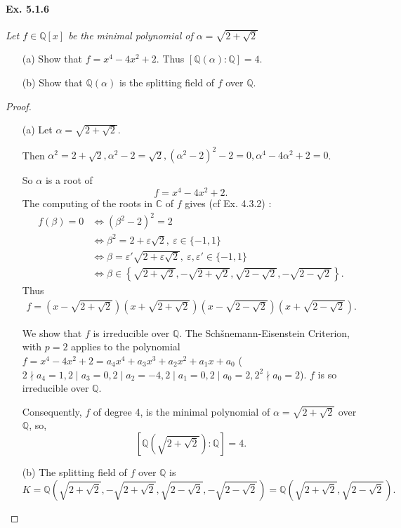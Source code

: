 \documentclass[11pt,a4paper]{article}
\newcommand{\Q}{\mathbb{Q}}
\newcommand{\C}{\mathbb{C}}
\begin{document}
\paragraph{Ex. 5.1.6}

{\it Let $f\in \Q[x]$ be the minimal polynomial of $\alpha = \sqrt{2+\sqrt{2}}$
\begin{enumerate}
\item[(a)] Show that $f = x^4-4x^2+2$. Thus $[\Q(\alpha) : \Q]=4$.
\item[(b)] Show that $\Q(\alpha)$ is the splitting field of $f$ over $\Q$.
\end{enumerate}
}

\begin{proof}
\begin{enumerate}
\item[(a)]
Let $\alpha= \sqrt{2+\sqrt{2}}$. 

Then $\alpha^2 = 2 + \sqrt{2}, \alpha^2-2 = \sqrt{2}, (\alpha^2-2)^2 - 2= 0, \alpha^4 - 4 \alpha^2 + 2 = 0$.

 So $\alpha$ is a root of
$$f= x^4-4x^2+2.$$
The computing of the roots in $\C$ of $f$ gives (cf Ex. 4.3.2) : 
\begin{align*}
f(\beta) = 0 &\iff (\beta^2-2)^2 = 2\\
&\iff \beta^2 = 2 +\varepsilon \sqrt{2}, \ \varepsilon \in \{-1,1\}\\
&\iff \beta =\varepsilon' \sqrt{2 +\varepsilon \sqrt{2}},\  \varepsilon, \varepsilon' \in \{-1,1\}\\
&\iff \beta \in \left\{   \sqrt{2+\sqrt{2}}, -\sqrt{2+\sqrt{2}}, \sqrt{2-\sqrt{2}},-\sqrt{2-\sqrt{2}}\right\}.
\end{align*}
Thus 
\begin{align}
f = \left(x-\sqrt{2+\sqrt{2}}\right)\left(x+\sqrt{2+\sqrt{2}}\right)\left(x-\sqrt{2-\sqrt{2}}\right)\left(x+\sqrt{2-\sqrt{2}}\right).
\end{align}

We show that $f$ is irreducible over $\Q$.
The Schšnemann-Eisenstein Criterion,  with $p=2$ applies to the polynomial $f= x^4-4x^2+2 = a_4x^4+a_3x^3+a_2x^2+a_1x+a_0$ 
($2 \nmid a_4 =1, 2 \mid a_3=0,2\mid a_2=-4, 2 \mid a_1=0,2 \mid a_0=2,  2^2 \nmid a_0 = 2$). $f$ is so irreducible over $\mathbb{Q}$.

Consequently, $f$ of degree 4, is the minimal polynomial of $\alpha=  \sqrt{2+\sqrt{2}}$ over $\Q$, so,
$$\left[\Q\left(\sqrt{2+\sqrt{2}}\right):\Q\right] = 4.$$

\item[(b)]
The splitting field of $f$ over $\Q$ is $$K=\Q\left( \sqrt{2+\sqrt{2}}, -\sqrt{2+\sqrt{2}}, \sqrt{2-\sqrt{2}},-\sqrt{2-\sqrt{2}}\right) = \Q\left( \sqrt{2+\sqrt{2}} , \sqrt{2-\sqrt{2}}\right).$$


\end{enumerate}
\end{proof}
\end{document}
